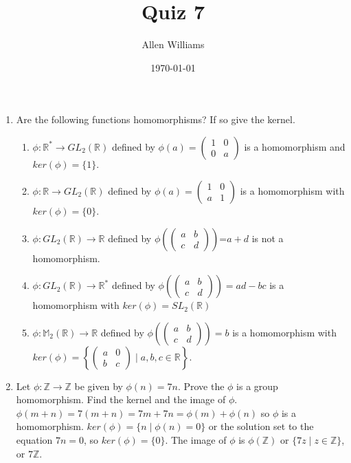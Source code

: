 \documentclass{amsart}
\title{Quiz 7}
\author{Allen Williams }
\date{\today}
\begin{document}
\maketitle

\begin{enumerate}
    \item 
    Are the following functions homomorphisms?  If so give the kernel.\begin{enumerate}
              \item $\phi:\mathbb{R}^*\to GL_2(\mathbb{R})$ defined by $\phi(a)=\left(\begin{array}{cc} 1 & 0 \\ 0 & a \end{array} \right)$ is a homomorphism and $ker(\phi)=\{1\}.$
              \item $\phi:\mathbb{R}\to GL_2(\mathbb{R})$ defined by $\phi(a)=\left( \begin{array}{cc} 1 & 0 \\ a & 1 \end{array} \right)$ is a homomorphism with $ker(\phi)=\{0\}$.
              \item $\phi:GL_2(\mathbb{R})\to \mathbb{R}$ defined by $\phi\left(\left( \begin{array}{cc} a & b \\ c & d \end{array}\right)\right)$=$a+d$ is not a homomorphism.
              \item $\phi:GL_2(\mathbb{R})\to \mathbb{R}^*$ defined by $\phi\left(\left( \begin{array}{cc} a & b \\ c & d \end{array}\right)\right)=ad-bc$ is a homomorphism with $ker(\phi)=SL_2(\mathbb{R})$
              \item $\phi:\mathbb{M}_2(\mathbb{R})\to \mathbb{R}$ defined by $\phi\left(\left( \begin{array}{cc} a & b \\ c & d \end{array}\right)\right)=b$ is a homomorphism with $ker(\phi)=\left\{\left(\begin{array}{cc} a & 0 \\ b & c \end{array}\right)\mid a,b,c\in\mathbb{R}\right\}$.
          \end{enumerate}
    \item Let $\phi:\mathbb{Z}\to \mathbb{Z}$ be given by $\phi(n)=7n$.  Prove the $\phi$ is a group homomorphism.  Find the kernel and the image of $\phi$. $\phi(m+n)=7(m+n)=7m+7n=\phi(m)+\phi(n)$ so $\phi$ is a homomorphism.  $ker(\phi)=\{n \mid \phi(n)=0\}$ or the solution set to the equation $7n=0$, so $ker(\phi)=\{0\}$. The image of $\phi$ is $\phi(\mathbb{Z})$ or $\{7z\mid z\in \mathbb{Z}\}$, or $7\mathbb{Z}$.

\end{enumerate}
\end{document}
